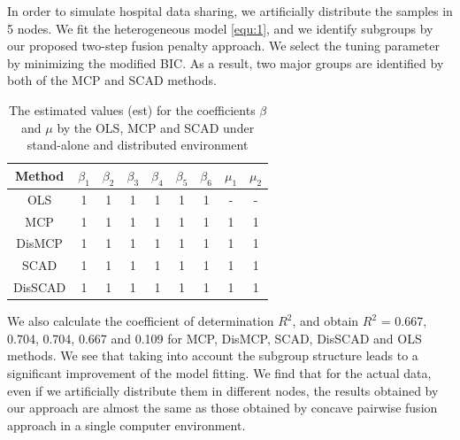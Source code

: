 \documentclass[review]{elsarticle}
\begin{document}
In order to simulate hospital data sharing, we artificially distribute the samples in 5 nodes. We fit the heterogeneous model \ref{equ:1}, and we identify subgroups by our proposed two-step fusion penalty approach. We select the tuning parameter by minimizing the modified BIC. As a result, two major groups are identified by both of the MCP and SCAD methods.
\begin{table}[H]
	\centering
	\fontsize{5.5}{6}\selectfont
	\begin{threeparttable}
		\caption{The estimated values (est) for the coefficients $\beta$ and $\mu$ by the OLS, MCP and SCAD under stand-alone and distributed environment}
		\label{tab:3}
		\begin{tabular}{ccccccccc}
			\toprule
			Method&$\beta_1$&$\beta_2$&$\beta_3$&$\beta_4$&$\beta_5$&$\beta_6$&$\mu_1$&$\mu_2$\\
			\midrule
			OLS&1&1&1&1&1&1&-&-\\
			MCP&1&1&1&1&1&1&1&1\\
			DisMCP&1&1&1&1&1&1&1&1\\
			SCAD&1&1&1&1&1&1&1&1\\
			DisSCAD&1&1&1&1&1&1&1&1\\
			\bottomrule
		\end{tabular}
	\end{threeparttable}
\end{table}
We also calculate the coefficient of determination $R^2$, and obtain $R^2$ = 0.667, 0.704, 0.704, 0.667 and 0.109 for MCP, DisMCP, SCAD, DisSCAD and OLS methods. We see that taking into account the subgroup structure leads to a significant improvement of the model fitting. We find that for the actual data, even if we artificially distribute them in different nodes, the results obtained by our approach are almost the same as those obtained by concave pairwise fusion approach in a single computer environment.
\end{document}
